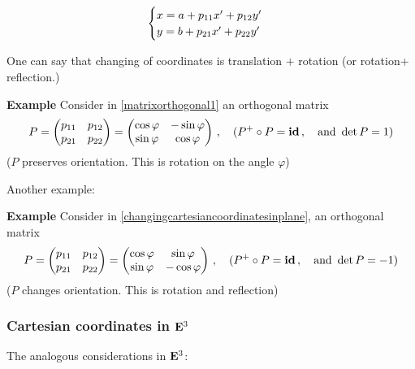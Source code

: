 \documentclass[12pt]{article}
\numberwithin{equation}{section}
\begin{document}
   \begin{equation*}\label{changingcartesiancoordinatesinplane}
\begin{cases}
    x=a+p_{11}x'+p_{12}y'\cr
    y=b+p_{21}x'+p_{22}y'\cr
 \end{cases}
   \end{equation*}


One can say that changing of coordinates
is translation $+$ rotation (or rotation+ reflection.)


{\bf Example} Consider
in \eqref{matrixorthogonal1}
an orthogonal matrix
       $$
P=     \begin{pmatrix}
    p_{11} &p_{12}\cr
    p_{21} &p_{22}\cr
         \end{pmatrix}=
      \begin{pmatrix}
    \cos\varphi &-\sin\varphi\cr
    \sin\varphi &\cos\varphi\cr
         \end{pmatrix}\,,\quad
       (P^+\circ P={\bf id}\,,\quad {\rm and}
\,\,\det P=1)
         $$ 
($P$ preserves orientation. 
This is rotation on the angle $\varphi$) 

Another example:

{\bf Example}
Consider in
\eqref{changingcartesiancoordinatesinplane},
an orthogonal matrix
       $$
P=     \begin{pmatrix}
    p_{11} &p_{12}\cr
    p_{21} &p_{22}\cr
         \end{pmatrix}=
      \begin{pmatrix}
    \cos\varphi &\sin\varphi\cr
    \sin\varphi &-\cos\varphi\cr
         \end{pmatrix}\,,\quad
       (P^+\circ P={\bf id}\,,\quad {\rm and}
\,\,\det P=-1)
         $$ 
($P$ changes orientation. 
This is rotation and reflection) 




\subsubsection {Cartesian coordinates in ${\bf E}^3$}

The analogous considerations  in ${\bf E}^3$:
\end{document}
